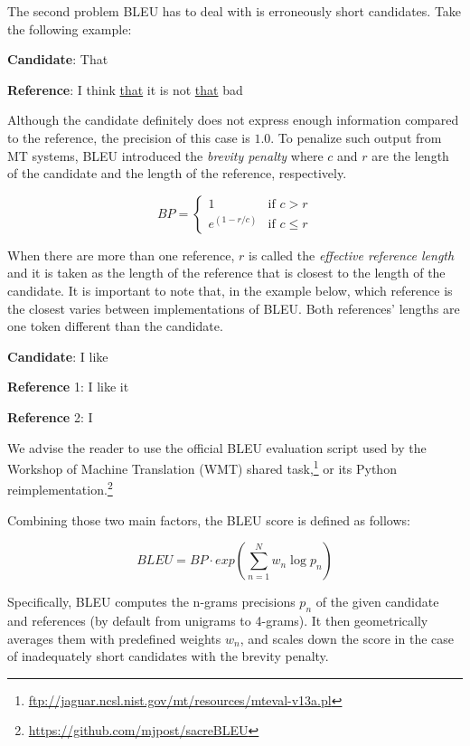 The second problem BLEU has to deal with is erroneously short candidates.
Take the following example:

\bigskip

\textbf{Candidate}: That

\textbf{Reference}: I think \underline{that} it is not \underline{that} bad

\bigskip

Although the candidate definitely does not express enough information compared to the reference, the precision of this case is $1.0$.
To penalize such output from MT systems, BLEU introduced the \textit{brevity penalty} where $c$ and $r$ are the length of the candidate and the length of the reference, respectively.

\[BP=\begin{cases} 1 & \mbox{if } c>r \\ e^{(1-r/c)} & \mbox{if } c\le r \end{cases}\]

When there are more than one reference, $r$ is called the \textit{effective reference length} and it is taken as the length of the reference that is closest to the length of the candidate.
It is important to note that, in the example below, which reference is the closest varies between implementations of BLEU. Both references' lengths are one token different than the candidate.

\bigskip

\textbf{Candidate}: I like

\textbf{Reference} 1: I like it

\textbf{Reference} 2: I

\bigskip

We advise the reader to use the official BLEU evaluation script used by the Workshop of Machine Translation (WMT) shared task,\footnote{\url{ftp://jaguar.ncsl.nist.gov/mt/resources/mteval-v13a.pl}} or its Python reimplementation.\footnote{\url{https://github.com/mjpost/sacreBLEU}}

Combining those two main factors, the BLEU score is defined as follows:

\[BLEU=BP\cdot exp\left( \sum_{n=1}^{N} w_n \log p_n \right)\]

Specifically, BLEU computes the n-grams precisions $p_n$ of the given candidate and references (by default from unigrams to 4-grams).
It then geometrically averages them with predefined weights $w_n$, and scales down the score in the case of inadequately short candidates with the brevity penalty.

